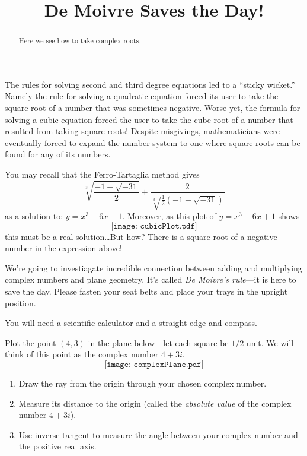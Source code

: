 \documentclass{ximera}
\title{De Moivre Saves the Day!}
\begin{document}
\begin{abstract}
Here we see how to take complex roots.
\end{abstract}
\maketitle


The rules for solving second and third degree equations led to a
``sticky wicket.''  Namely the rule for solving a quadratic equation
forced its user to take the square root of a number that was sometimes
negative.  Worse yet, the formula for solving a cubic equation forced
the user to take the cube root of a number that resulted from taking
square roots!  Despite misgivings, mathematicians were eventually
forced to expand the number system to one where square roots can be
found for any of its numbers.

You may recall that the Ferro-Tartaglia method gives 
\[
\sqrt[3]{\frac{-1+\sqrt{-31}}{2}} + \frac{2}{\sqrt[3]{\frac{1}{2}(-1+\sqrt{-31})}}
\]
as a solution to: $y = x^3-6x+1$. Moreover, as this plot of $y = x^3-6x+1$ shows
\[
\texttt{[image: cubicPlot.pdf]}
\]
this must be a real solution\dots But how? There is a square-root of a
negative number in the expression above! 

We're going to investiagate incredible connection between adding and
multiplying complex numbers and plane geometry.  It's called \textit{De
Moivre's rule}---it is here to save the day.  Please fasten your seat
belts and place your trays in the upright position.



You will need a scientific calculator and a straight-edge and compass.

\break

\begin{question}
Plot the point $(4,3)$ in the plane below---let each square be $1/2$
unit.  We will think of this point as the complex number $4 + 3i$.
\[
\texttt{[image: complexPlane.pdf]}
\]
\begin{enumerate}
\item Draw the ray from the origin through your chosen complex number.
\item Measure its distance to the origin (called the \textit{absolute value} of the complex number $4 + 3i$). 
\item Use inverse tangent to measure the angle between your complex number and the positive real axis. 
\end{enumerate}
\end{question}
\end{document}
